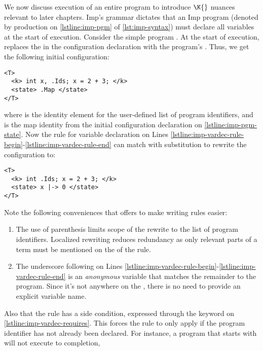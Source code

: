 We now discuss execution of an entire program to introduce $\K{}$ nuances
relevant to later chapters. Imp's grammar dictates that an
Imp program (denoted by production  on
\autoref{lstline:imp-pgm} of \autoref{lst:imp-syntax})
must declare all variables at the start of execution. Consider
the simple program .
At the start of execution, \K{} replaces the 
in the configuration declaration with the program's \AST{}.
Thus, we get the following initial configuration:
\begin{lstlisting}[language=k,style=ksty,frame=single]
<T>
  <k> int x, .Ids; x = 2 + 3; </k>
  <state> .Map </state>
</T>
\end{lstlisting}
where  is the identity element for the user-defined
list of program identifiers, and  is the map identity
from the initial configuration declaration on \autoref{lstline:imp-pgm-state}.
Now the rule for variable declaration on
Lines \ref{lstline:imp-vardec-rule-begin}-\ref{lstline:imp-vardec-rule-end}
can match with substitution 
to rewrite the configuration to:
\begin{lstlisting}[language=k,style=ksty,frame=single]
<T>
  <k> int .Ids; x = 2 + 3; </k>
  <state> x |-> 0 </state>
</T>
\end{lstlisting}
Note the following conveniences that \K{} offers to make writing rules easier:
\begin{enumerate}[label=\roman*)]
  \item The use of parenthesis limits scope of the rewrite to the
    list of program identifiers. Localized rewriting reduces redundancy
    as only relevant parts of a term must be mentioned on the \RHS{} of the
    rule.
  \item The underscore \inlinek{_} following 
    on Lines \ref{lstline:imp-vardec-rule-begin}-\ref{lstline:imp-vardec-rule-end}
    is an \emph{anonymous} variable that matches the remainder to the program.
    Since it's not anywhere on the \RHS{}, there is no need to provide an
    explicit variable name.
\end{enumerate}
Also that the rule has a side condition, expressed through the keyword 
on \autoref{lstline:imp-vardec-requires}. This forces the rule to only apply if
the program identifier has not already been declared. For instance,
a program that starts with  will not execute to completion,
